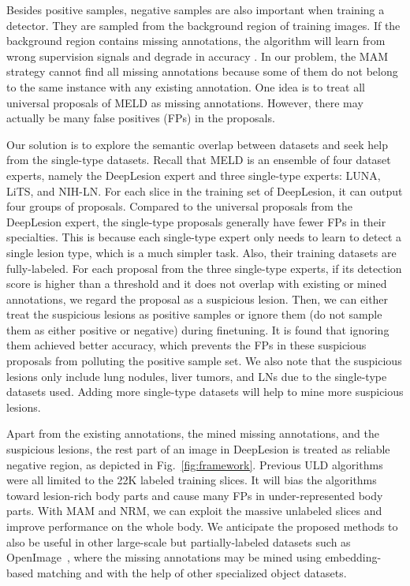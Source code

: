\documentclass[runningheads]{llncs}
\def\Fig#1{{Fig.~\ref{fig:#1}}}
\begin{document}
Besides positive samples, negative samples are also important when training a detector. They are sampled from the background region of training images. If the background region contains missing annotations, the algorithm will learn from wrong supervision signals and degrade in accuracy \cite{Niitani2019sample,Wu2019soft}. In our problem, the MAM strategy cannot find all missing annotations because some of them do not belong to the same instance with any existing annotation. One idea is to treat all universal proposals of MELD as missing annotations. However, there may actually be many false positives (FPs) in the proposals.

Our solution is to explore the semantic overlap between datasets and seek help from the single-type datasets. Recall that MELD is an ensemble of four dataset experts, namely the DeepLesion expert and three single-type experts: LUNA, LiTS, and NIH-LN. For each slice in the training set of DeepLesion, it can output four groups of proposals. Compared to the universal proposals from the DeepLesion expert, the single-type proposals generally have fewer FPs in their specialties. This is because each single-type expert only needs to learn to detect a single lesion type, which is a much simpler task. Also, their training datasets are fully-labeled. For each proposal from the three single-type experts, if its detection score is higher than a threshold  and it does not overlap with existing or mined annotations, we regard the proposal as a suspicious lesion. Then, we can either treat the suspicious lesions as positive samples or ignore them (do not sample them as either positive or negative) during finetuning. It is found that ignoring them achieved better accuracy, which prevents the FPs in these suspicious proposals from polluting the positive sample set. We also note that the suspicious lesions only include lung nodules, liver tumors, and LNs due to the single-type datasets used. Adding more single-type datasets will help to mine more suspicious lesions. 

Apart from the existing annotations, the mined missing annotations, and the suspicious lesions, the rest part of an image in DeepLesion is treated as reliable negative region, as depicted in \Fig{framework}. Previous ULD algorithms~\cite{Zlocha2019retina,Wang2019universal,Li2019MVP,Yan2019MULAN} were all limited to the 22K labeled training slices. It will bias the algorithms toward lesion-rich body parts and cause many FPs in under-represented body parts. With MAM and NRM, we can exploit the massive unlabeled slices and improve performance on the whole body. We anticipate the proposed methods to also be useful in other large-scale but partially-labeled datasets such as OpenImage~\cite{Kuznetsova2018open,Niitani2019sample}, where the missing annotations may be mined using embedding-based matching and with the help of other specialized object datasets.
\end{document}
